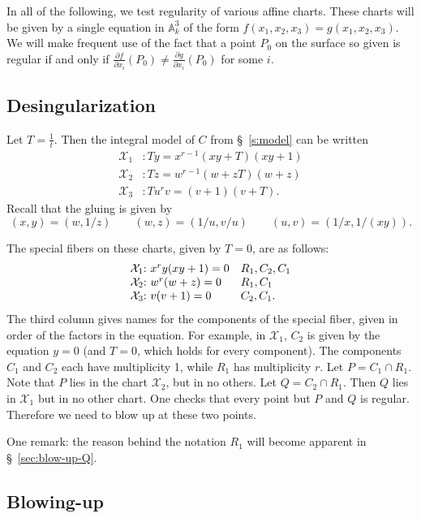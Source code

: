 \documentclass[reqno]{amsart}
\theoremstyle{definition}
\theoremstyle{remark}
\def\XX{\mathcal{X}}
\begin{document}
In all of the following, we test regularity of various affine charts. These charts will be given by a single equation in $\mathbb{A}^3_k$ of the form $f(x_1,x_2,x_3) = g(x_1,x_2,x_3)$. We will make frequent use of the fact that a point $P_0$ on the surface so given is regular if and only if $\frac{\partial f}{\partial x_i}(P_0) \neq \frac{\partial g}{\partial x_i}(P_0)$ for some $i$.

\subsection{Desingularization}
\label{sec:desingularization}

Let $T = \frac{1}{t}$. Then the integral model of $C$ from \S~\ref{s:model} can be written
\begin{align*}
  \XX_1&: Ty = x^{r-1}(xy+T)(xy+1) \\
  \XX_2&: Tz = w^{r-1}(w+zT)(w+z) \\
  \XX_3&: Tu^rv = (v+1)(v+T).
\end{align*}
Recall that the gluing is given by
\[
(x,y)=(w,1/z)\qquad(w,z)=(1/u,v/u)\qquad(u,v)=(1/x,1/(xy)).
\]


The special fibers on these charts, given by $T = 0$, are as follows:
\[
\begin{array}{l@{:\,\,}ll}
\XX_1 & x^ry(xy+1) = 0 & R_1, C_2, C_1 \\
\XX_2 & w^r(w + z) = 0 & R_1, C_1 \\
\XX_3 & v(v + 1) = 0 & C_2, C_1.
\end{array}
\]
The third column gives names for the components of the special fiber, given in order of the factors in the equation. For example, in $\XX_1$, $C_2$ is given by the equation $y = 0$ (and $T = 0$, which holds for every component). The components $C_1$ and $C_2$ each have multiplicity 1, while $R_1$ has multiplicity $r$. Let $P = C_1 \cap R_1$. Note that $P$ lies in the chart $\XX_2$, but in no others. Let $Q = C_2 \cap R_1$. Then $Q$ lies in $\XX_1$ but in no other chart. One checks that every point but $P$ and $Q$ is regular. Therefore we need to blow up at these two points.

One remark: the reason behind the notation $R_1$ will become apparent in \S~\ref{sec:blow-up-Q}.

\subsection{Blowing-up}
\label{sec:blowing-up}
\end{document}
